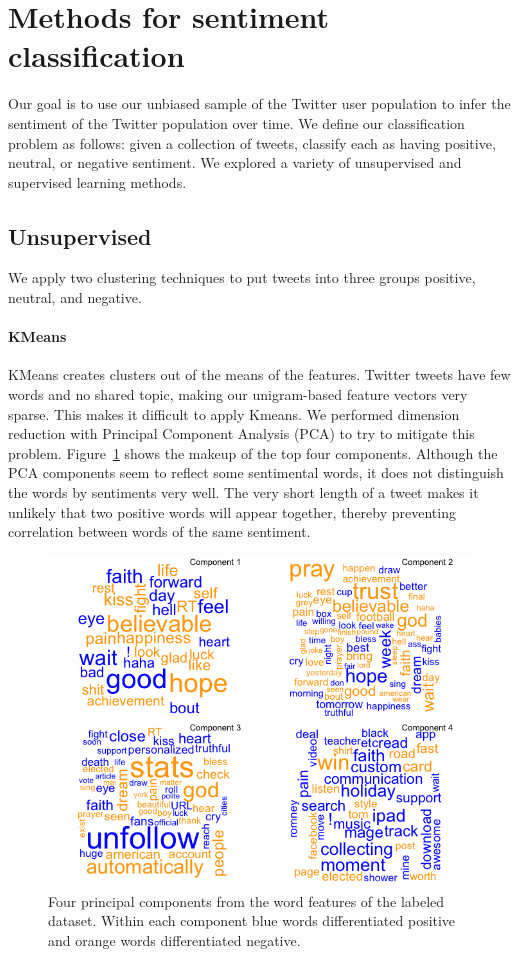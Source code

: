 \section{Methods for sentiment classification}
\label{sec:class}

Our goal is to use our unbiased sample of the Twitter user population
to infer the sentiment of the Twitter population over time. We define our
classification problem as follows: given a collection of tweets, classify each
as having positive, neutral, or negative sentiment. We explored a variety of
unsupervised and supervised learning methods. 

\subsection{Unsupervised}

We apply two clustering techniques to put tweets into three groups positive, neutral, and negative.

\paragraph{KMeans}

KMeans creates clusters out of the means of the features. Twitter
tweets have few words and no shared topic, making our unigram-based
feature vectors very sparse. This makes it difficult to apply Kmeans.
We performed dimension reduction with Principal Component Analysis
(PCA) to try to mitigate this problem. Figure~\ref{fig:pca} shows the makeup
of the top four components. Although the PCA components seem to
reflect some sentimental words, it does not distinguish the words by
sentiments very well. The very short length of a tweet makes it unlikely
that two positive words will appear together, thereby preventing
correlation between words of the same sentiment.

\begin{figure}[htb]
\begin{center}
  \includegraphics[width=0.8\linewidth]{figs/PCAcomp.png}
\begin{minipage}{0.8\linewidth}
\end{minipage}
\end{center}
\caption{Four principal components from the word features of the labeled dataset. Within each component blue words differentiated positive and orange words differentiated negative.}
\label{fig:pca}
\end{figure}


